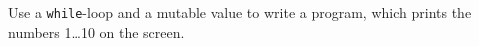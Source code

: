 Use a \lstinline{while}-loop and a mutable value to write a program, which prints the numbers 1\dots 10 on the screen.